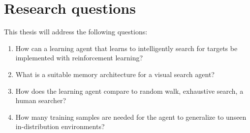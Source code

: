 \section{Research questions}
\label{sec:research-questions}

% 
% 
% 
% 
% 
% 
% 
% 

This thesis will address the following questions:

\begin{enumerate}
  \item \label{itm:rq1} How can a learning agent that learns to intelligently search for targets be implemented with reinforcement learning?
  \item What is a suitable memory architecture for a visual search agent?
  \item \label{itm:rq2} How does the learning agent compare to random walk, exhaustive search, a human searcher?
  \item \label{itm:rq3} How many training samples are needed for the agent to generalize to unseen in-distribution environments?
\end{enumerate}

